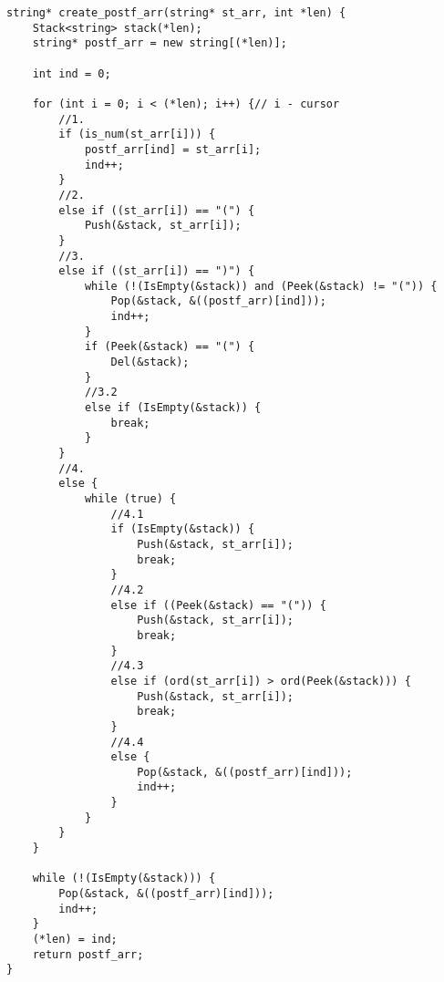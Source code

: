 \begin{lstlisting}[label = list4, caption = Программная реализация функции превода в постфиксную запись]
string* create_postf_arr(string* st_arr, int *len) {
	Stack<string> stack(*len);
	string* postf_arr = new string[(*len)];
	
	int ind = 0;
	
	for (int i = 0; i < (*len); i++) {// i - cursor
		//1.
		if (is_num(st_arr[i])) {
			postf_arr[ind] = st_arr[i];
			ind++;
		}
		//2.
		else if ((st_arr[i]) == "(") {
			Push(&stack, st_arr[i]);
		}
		//3.
		else if ((st_arr[i]) == ")") {
			while (!(IsEmpty(&stack)) and (Peek(&stack) != "(")) {
				Pop(&stack, &((postf_arr)[ind]));
				ind++;
			}
			if (Peek(&stack) == "(") {
				Del(&stack);
			}
			//3.2
			else if (IsEmpty(&stack)) {
				break;
			}
		}
		//4.
		else {
			while (true) {
				//4.1
				if (IsEmpty(&stack)) {
					Push(&stack, st_arr[i]);
					break;
				}
				//4.2
				else if ((Peek(&stack) == "(")) {
					Push(&stack, st_arr[i]);
					break;
				}
				//4.3
				else if (ord(st_arr[i]) > ord(Peek(&stack))) {
					Push(&stack, st_arr[i]);
					break;
				}
				//4.4
				else {
					Pop(&stack, &((postf_arr)[ind]));
					ind++;
				}
			}
		}
	}
	
	while (!(IsEmpty(&stack))) {
		Pop(&stack, &((postf_arr)[ind]));
		ind++;
	}
	(*len) = ind;
	return postf_arr;
}
\end{lstlisting}

